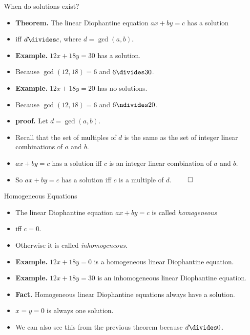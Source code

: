 \documentclass{beamer}
\begin{document}
\begin{frame}{When do solutions exist?}

\begin{itemize}
  \item \textbf{Theorem.} The linear Diophantine equation $ax+by=c$ has a solution
  \item iff $d\divides c$, where $d=\gcd(a,b)$.
  \item \textbf{Example.} $12x + 18y = 30$ has a solution.
  \item Because $\gcd(12,18) = 6$ and $6\divides 30$.
  \item \textbf{Example.} $12x + 18y = 20$ has no solutions.
  \item Because $\gcd(12,18) = 6$ and $6\ndivides 20$.
  \item \textbf{proof.} Let $d=\gcd(a,b)$.
  \item Recall that the set of multiples of $d$ is the same as the set of
  integer linear combinations of $a$ and $b$.
  \item $ax + by = c$ has a solution iff $c$ is an integer linear combination
  of $a$ and $b$.
  \item So $ax + by = c$ has a solution iff $c$ is a multiple of $d$. $\qed$
\end{itemize}

\end{frame}


\begin{frame}{Homogeneous Equations}

\begin{itemize}
  \item The linear Diophantine equation $ax+by=c$ is called \emph{homogeneous}
  \item iff $c=0$.
  \item Otherwise it is called \emph{inhomogeneous.}
  \item \textbf{Example.} $12x + 18y = 0$ is a homogeneous linear Diophantine equation.
  \item \textbf{Example.} $12x + 18y = 30$ is an inhomogeneous linear Diophantine equation.
  \item \textbf{Fact.} Homogeneous linear Diophantine equations always have a solution.
  \item $x=y=0$ is always one solution.
  \item We can also see this from the previous theorem because $d\divides 0$.
\end{itemize}

\end{frame}
\end{document}
